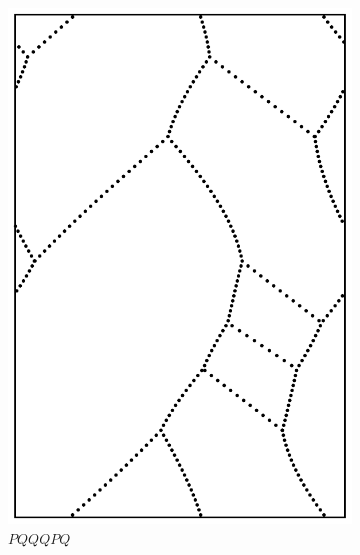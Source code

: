 \documentclass[12pt,twoside]{reedthesis}
\theoremstyle{definition}
\begin{document}
\begin{figure}[h]
\begin{subfigure}[t]{0.24\textwidth}
    \includegraphics[width=\textwidth]{figures/string_cheese_appendix/pqqqpq.pdf}
    \caption*{$PQQQPQ$}
    \vspace{5mm}
  \end{subfigure}
  \hfill
  \begin{subfigure}[t]{0.24\textwidth}

\end{subfigure}
\end{figure}
\end{document}
